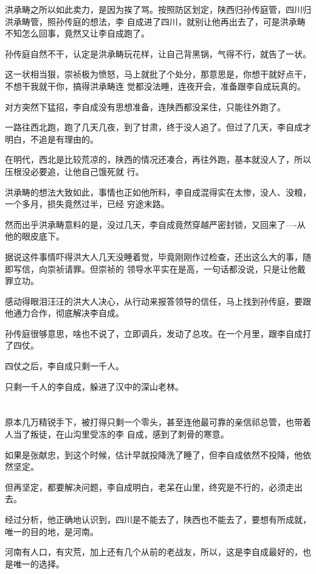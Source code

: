 \documentclass[11pt,a4paper,onecolumn]{article}
\begin{document}
洪承畴之所以如此卖力，是因为挨了骂。按照防区划定，陕西归孙传庭管，四川归洪承畴管，照孙传庭的想法，李
自成进了四川，就别让他再出去了，可是洪承畴不知怎么回事，竟然又让李自成跑了。

孙传庭自然不干，认定是洪承畴玩花样，让自己背黑锅，气得不行，就告了一状。

这一状相当狠，崇祯极为愤怒，马上就批了个处分，那意思是，你想干就好点干，不想干我就干你，搞得洪承畴连
觉都没法睡，连夜开会，准备跟李自成玩真的。

对方突然下猛招，李自成没有思想准备，连陕西都没呆住，只能往外跑了。

一路往西北跑，跑了几天几夜，到了甘肃，终于没人追了。但过了几天，李自成才明白，不追是有理由的。

在明代，西北是比较荒凉的，陕西的情况还凑合，再往外跑，基本就没人了，所以压根没必要追，让他自己饿死就
行。

洪承畴的想法大致如此，事情也正如他所料，李自成混得实在太惨，没人、没粮，一个多月，损失竟然过半，已经
穷途末路。

然而出乎洪承畴意料的是，没过几天，李自成竟然穿越严密封锁，又回来了----从他的眼皮底下。

据说这件事情吓得洪大人几天没睡着觉，毕竟刚刚作过检查，还出这么大的事，随即写信，向崇祯请罪。但崇祯的
领导水平实在是高，一句话都没说，只是让他戴罪立功。

感动得眼泪汪汪的洪大人决心，从行动来报答领导的信任，马上找到孙传庭，要跟他通力合作，彻底解决李自成。

孙传庭很够意思，啥也不说了，立即调兵，发动了总攻。在一个月里，跟李自成打了四仗。

四仗之后，李自成只剩一千人。

只剩一千人的李自成，躲进了汉中的深山老林。

\section[\thesection]{}

原本几万精锐手下，被打得只剩一个零头，甚至连他最可靠的亲信祁总管，也带着人当了叛徒，在山沟里受冻的李
自成，感到了刺骨的寒意。

如果是张献忠，到这个时候，估计早就投降洗了睡了，但李自成依然不投降，他依然坚定。

但再坚定，都要解决问题，李自成明白，老呆在山里，终究是不行的，必须走出去。

经过分析，他正确地认识到，四川是不能去了，陕西也不能去了，要想有所成就，唯一的目的地，是河南。

河南有人口，有灾荒，加上还有几个从前的老战友，所以，这是李自成最好的，也是唯一的选择。
\end{document}
